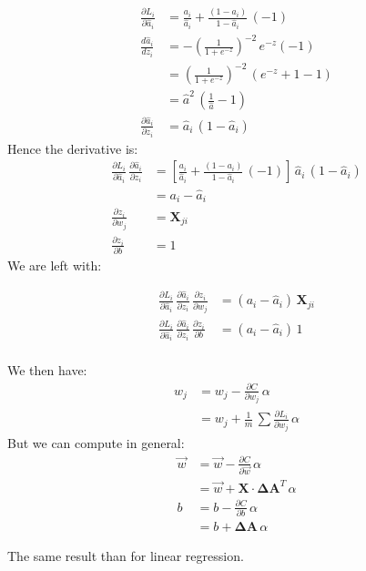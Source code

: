 \begin{align*}
  \frac{\partial L_i}{\partial \hat{a}_i} &= \frac{a_i}{\hat{a}_i} + \frac{(1-a_i)}{1-\hat{a}_i}\,(-1) \\
  \frac{d\hat{a}_i}{dz_i}&=-\left(\frac{1}{1+e^{-z}}\right)^{-2}\,e^{-z}(-1)\\
  &=\left(\frac{1}{1+e^{-z}}\right)^{-2}\,(e^{-z} + 1 -1)\\
  &= \hat{a}^2\,(\frac{1}{\hat{a}} -1) \\
  \frac{\partial \hat{a}_i}{\partial z_i} &= \hat{a}_i\,(1-\hat{a}_i)
\end{align*}
Hence the derivative is:
\begin{align*}
  \frac{\partial L_i}{\partial \hat{a}_i}\,\frac{\partial \hat{a}_i}{\partial z_i} &= \left[ \frac{a_i}{\hat{a}_i} + \frac{(1-a_i)}{1-\hat{a}_i}\,(-1) \right]\,\hat{a}_i\,(1-\hat{a}_i)\\
  &= a_i - \hat{a}_i\\
  \frac{\partial z_i}{\partial w_j} &= \mathbf{X}_{ji}\\
  \frac{\partial z_i}{\partial b} &= 1
\end{align*}
We are left with:

\begin{align*}
  \frac{\partial L_i}{\partial \hat{a}_i}\,\frac{\partial \hat{a}_i}{\partial z_i}\,\frac{\partial z_i}{\partial w_j} &= \left(a_i - \hat{a}_i\right)\,\mathbf{X}_{ji}\\
  \frac{\partial L_i}{\partial \hat{a}_i}\,\frac{\partial \hat{a}_i}{\partial z_i}\,\frac{\partial z_i}{\partial b} &= \left(a_i - \hat{a}_i\right)\,1\\
\end{align*}

We then have:
\begin{align*}
  w_j &= w_j - \frac{\partial C}{\partial w_j}\,\alpha\\
  &= w_j + \frac{1}{m}\,\sum \frac{\partial L_i}{\partial w_j}\,\alpha\label{eq:same}
\end{align*}
But we can compute in general:
\begin{align}
  \vec{w} &= \vec{w} - \frac{\partial C}{\partial \vec{w}}\,\alpha\nonumber\\
  &= \vec{w} + \mathbf{X}\cdot{}\mathbf{\Delta A}^T\,\alpha\\
  b &= b - \frac{\partial C}{\partial b}\,\alpha\nonumber\\
  &= b + \mathbf{\Delta A}\,\alpha
\end{align}

The same result than for linear regression. 
